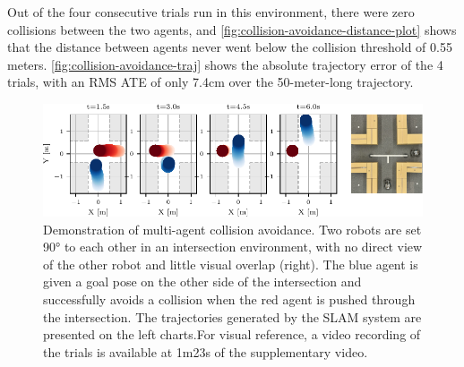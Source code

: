 Out of the four consecutive trials run in this environment, there were zero collisions between the two agents, and \autoref{fig:collision-avoidance-distance-plot} shows that the distance between agents never went below the collision threshold of 0.55 meters. \autoref{fig:collision-avoidance-traj} shows the absolute trajectory error of the 4 trials, with an RMS ATE of only 7.4cm over the 50-meter-long trajectory.


\begin{figure}[h]
    \centering
    \captionsetup{format=plain, skip=0.5em}
    \includegraphics[width=0.9\linewidth]{figures/mar25_1_tracer_graph.pdf}

    \caption{Demonstration of multi-agent collision avoidance. Two robots are set 90° to each other in an intersection environment, with no direct view of the other robot and little visual overlap (right). The blue agent is given a goal pose on the other side of the intersection and successfully avoids a collision when the red agent is pushed through the intersection. The trajectories generated by the SLAM system are presented on the left charts.\captionbreak For visual reference, a video recording of the trials is available at 1m23s of the supplementary video\protect\footnotemark[1].}
    \label{fig:collision-avoidance}
\end{figure}

